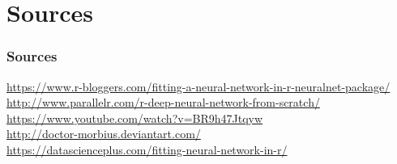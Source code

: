 \documentclass[compress]{beamer}
\begin{document}
\section*{Sources}
\begin{frame}
\frametitle{Sources}
\url{https://www.r-bloggers.com/fitting-a-neural-network-in-r-neuralnet-package/}\\
\url{http://www.parallelr.com/r-deep-neural-network-from-scratch/}\\
\url{https://www.youtube.com/watch?v=BR9h47Jtqyw}\\
\url{http://doctor-morbius.deviantart.com/}\\
\url{https://datascienceplus.com/fitting-neural-network-in-r/}%
\end{frame}
\end{document}
